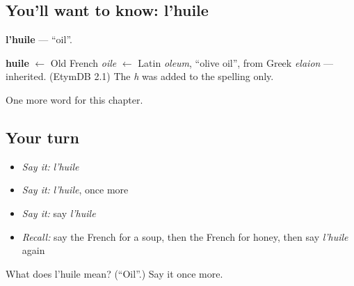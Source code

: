 \subsection*{You'll want to know: l'huile}
\textbf{l'huile} — \textquotedblleft{}oil\textquotedblright{}.

\begin{cousinweb}
\textbf{huile} $\leftarrow$ Old French \emph{oile} $\leftarrow$ Latin \emph{oleum}, \textquotedblleft{}olive oil\textquotedblright{}, from Greek \emph{elaion} — inherited. (EtymDB 2.1) The \emph{h} was added to the spelling only.
\end{cousinweb}

\begin{grammarlens}[title={What you've built}]
One more word for this chapter.
\end{grammarlens}

\subsection*{Your turn}
\begin{itemize}
\raggedright
  \item \emph{Say it:} \emph{l'huile}
  \item \emph{Say it:} \emph{l'huile}, once more
  \item \emph{Say it:} say \emph{l'huile}
  \item \emph{Recall:} say the French for a soup, then the French for honey, then say \emph{l'huile} again
\end{itemize}

\begin{tcolorbox}[breakable,colback=teal!4,colframe=teal!35!black,title={Before you move on}]
What does l'huile mean? (\textquotedblleft{}Oil\textquotedblright{}.) Say it once more.
\end{tcolorbox}

